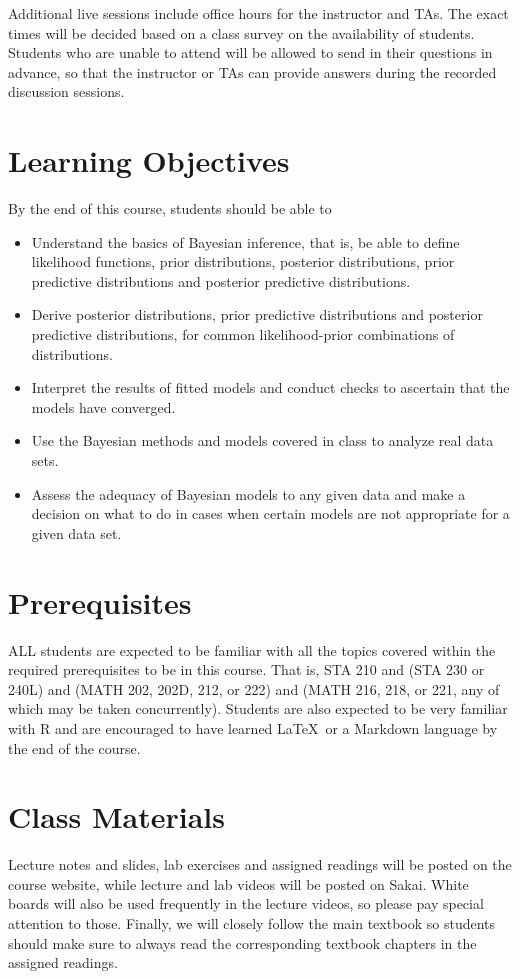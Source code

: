 \documentclass[11pt, a4paper]{article}
\begin{document}
Additional live sessions include office hours for the instructor and TAs. The exact times will be decided based on a class survey on the availability of students. Students who are unable to attend will be allowed to send in their questions in advance, so that the instructor or TAs can provide answers during the recorded discussion sessions.

\section{Learning Objectives}
By the end of this course, students should be able to
\begin{itemize}[label= {\color{darkblue}{\ArrowBoldRightStrobe}}]
	\item Understand the basics of Bayesian inference, that is, be able to define likelihood functions, prior distributions, posterior distributions, prior predictive distributions and posterior predictive distributions.
	\item Derive posterior distributions, prior predictive distributions and posterior predictive distributions, for common likelihood-prior combinations of distributions.
	\item Interpret the results of fitted models and conduct checks to ascertain that the models have converged.
	\item Use the Bayesian methods and models covered in class to analyze real data sets.
	\item Assess the adequacy of Bayesian models to any given data and make a decision on what to do in cases when certain models are not appropriate for a given data set.
\end{itemize}


\section{Prerequisites}
ALL students are expected to be familiar with all the topics covered within the required prerequisites to be in this course. That is, STA 210 and (STA 230 or 240L) and (MATH 202, 202D, 212, or 222) and (MATH 216, 218, or 221, any of which may be taken concurrently). Students are also expected to be very familiar with \textsf{R} and are encouraged to have learned \LaTeX \ or a Markdown language by the end of the course.


\section{Class Materials}
Lecture notes and slides, lab exercises and assigned readings will be posted on the course website, while lecture and lab videos will be posted on Sakai. White boards will also be used frequently in the lecture videos, so please pay special attention to those. Finally, we will closely follow the main textbook so students should make sure to always read the corresponding textbook chapters in the assigned readings.
\end{document}

